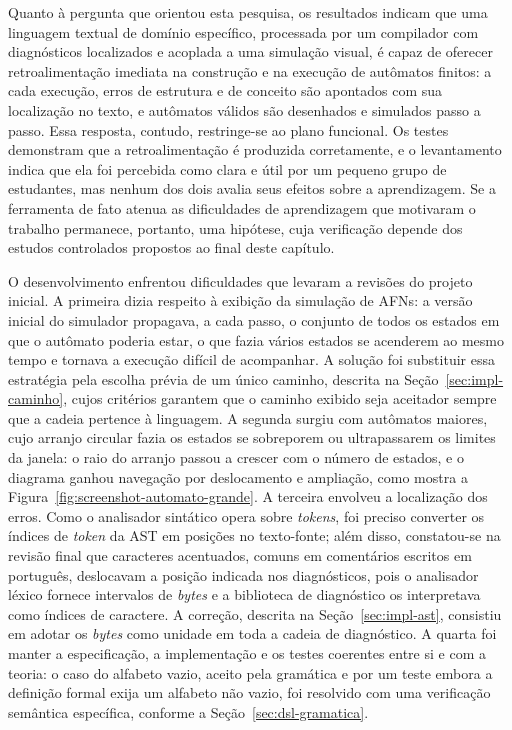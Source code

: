 \documentclass[
    12pt
    ,oneside
    ,a4paper
    ,chapter=TITLE
    ,section=TITLE
    ,sumario=abnt-6027-2012]{abntex2}
\begin{document}
Quanto à pergunta que orientou esta pesquisa, os resultados indicam que uma linguagem
textual de domínio específico, processada por um compilador com diagnósticos localizados e
acoplada a uma simulação visual, é capaz de oferecer retroalimentação imediata na construção
e na execução de autômatos finitos: a cada execução, erros de estrutura e de conceito são
apontados com sua localização no texto, e autômatos válidos são desenhados e simulados passo
a passo. Essa resposta, contudo, restringe-se ao plano funcional. Os testes demonstram que a
retroalimentação é produzida corretamente, e o levantamento indica que ela foi percebida como
clara e útil por um pequeno grupo de estudantes, mas nenhum dos dois avalia seus efeitos sobre
a aprendizagem. Se a ferramenta de fato atenua as dificuldades de aprendizagem que motivaram o
trabalho permanece, portanto, uma hipótese, cuja verificação depende dos estudos controlados
propostos ao final deste capítulo.

O desenvolvimento enfrentou dificuldades que levaram a revisões do projeto inicial. A
primeira dizia respeito à exibição da simulação de AFNs: a versão inicial do simulador
propagava, a cada passo, o conjunto de todos os estados em que o autômato poderia estar, o
que fazia vários estados se acenderem ao mesmo tempo e tornava a execução difícil de
acompanhar. A solução foi substituir essa estratégia pela escolha prévia de um único
caminho, descrita na Seção~\ref{sec:impl-caminho}, cujos critérios garantem que o caminho
exibido seja aceitador sempre que a cadeia pertence à linguagem. A segunda surgiu com
autômatos maiores, cujo arranjo circular fazia os estados se sobreporem ou ultrapassarem os
limites da janela: o raio do arranjo passou a crescer com o número de estados, e o diagrama
ganhou navegação por deslocamento e ampliação, como mostra a
Figura~\ref{fig:screenshot-automato-grande}. A terceira envolveu a localização dos erros.
Como o analisador sintático opera sobre \textit{tokens}, foi preciso converter os índices
de \textit{token} da AST em posições no texto-fonte; além disso, constatou-se na revisão
final que caracteres acentuados, comuns em comentários escritos em português, deslocavam a
posição indicada nos diagnósticos, pois o analisador léxico fornece intervalos de
\textit{bytes} e a biblioteca de diagnóstico os interpretava como índices de caractere. A
correção, descrita na Seção~\ref{sec:impl-ast}, consistiu em adotar os \textit{bytes}
como unidade em toda a cadeia de diagnóstico. A quarta foi manter a especificação, a
implementação e os testes coerentes entre si e com a teoria: o caso do alfabeto vazio,
aceito pela gramática e por um teste embora a definição formal exija um alfabeto não vazio,
foi resolvido com uma verificação semântica específica, conforme a
Seção~\ref{sec:dsl-gramatica}.
\end{document}
